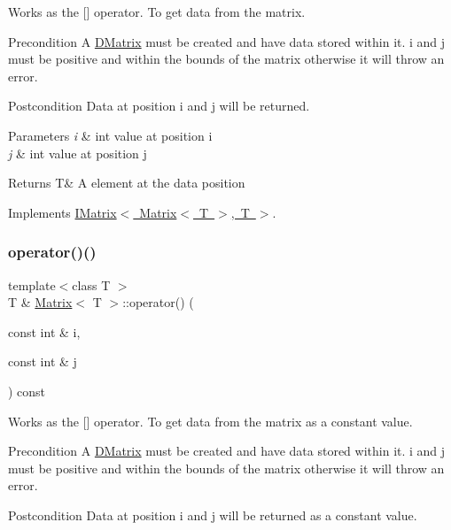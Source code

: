 Works as the \mbox{[}\mbox{]} operator. To get data from the matrix. 

\begin{DoxyPrecond}{Precondition}
A \mbox{\hyperlink{class_d_matrix}{D\+Matrix}} must be created and have data stored within it. i and j must be positive and within the bounds of the matrix otherwise it will throw an error. 
\end{DoxyPrecond}
\begin{DoxyPostcond}{Postcondition}
Data at position i and j will be returned.
\end{DoxyPostcond}

\begin{DoxyParams}{Parameters}
{\em i} & int value at position i \\
\hline
{\em j} & int value at position j \\
\hline
\end{DoxyParams}
\begin{DoxyReturn}{Returns}
T\& A element at the data position 
\end{DoxyReturn}


Implements \mbox{\hyperlink{class_i_matrix_a1e4246d163aaca1b224dec8839645ea9}{I\+Matrix$<$ Matrix$<$ T $>$, T $>$}}.

\mbox{\label{class_matrix_aabc9c2977b9bd176e17808e6bf96a69f}} 
\subsubsection{\texorpdfstring{operator()()}{operator()()}\hspace{0.1cm}{\footnotesize\ttfamily [2/2]}}
{\footnotesize\ttfamily template$<$class T $>$ \\
T \& \mbox{\hyperlink{class_matrix}{Matrix}}$<$ T $>$\+::operator() (\begin{DoxyParamCaption}\item[{const int \&}]{i,  }\item[{const int \&}]{j }\end{DoxyParamCaption}) const\hspace{0.3cm}{\ttfamily [virtual]}}



Works as the \mbox{[}\mbox{]} operator. To get data from the matrix as a constant value. 

\begin{DoxyPrecond}{Precondition}
A \mbox{\hyperlink{class_d_matrix}{D\+Matrix}} must be created and have data stored within it. i and j must be positive and within the bounds of the matrix otherwise it will throw an error. 
\end{DoxyPrecond}
\begin{DoxyPostcond}{Postcondition}
Data at position i and j will be returned as a constant value.
\end{DoxyPostcond}


